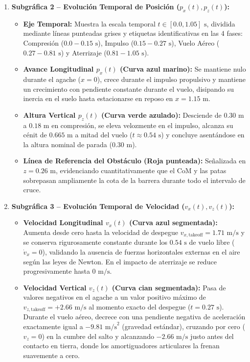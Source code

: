 \documentclass[11pt,a4paper]{article}
\begin{document}
\begin{enumerate}
    \item \textbf{Subgráfica 2 -- Evolución Temporal de Posición ($p_x(t), p_z(t)$):}
    \begin{itemize}
        \item \textbf{Eje Temporal:} Muestra la escala temporal $t \in [0.0, 1.05]\text{ s}$, dividida mediante líneas punteadas grises y etiquetas identificativas en las 4 fases: Compresión ($0.0 - 0.15\text{ s}$), Impulso ($0.15 - 0.27\text{ s}$), Vuelo Aéreo ($0.27 - 0.81\text{ s}$) y Aterrizaje ($0.81 - 1.05\text{ s}$).
        \item \textbf{Avance Longitudinal $p_x(t)$ (Curva azul marino):} Se mantiene nulo durante el agache ($x = 0$), crece durante el impulso propulsivo y mantiene un crecimiento con pendiente constante durante el vuelo, disipando su inercia en el suelo hasta estacionarse en reposo en $x = 1.15\text{ m}$.
        \item \textbf{Altura Vertical $p_z(t)$ (Curva verde azulado):} Desciende de $0.30\text{ m}$ a $0.18\text{ m}$ en compresión, se eleva velozmente en el impulso, alcanza su cénit de $0.665\text{ m}$ a mitad del vuelo ($t \approx 0.54\text{ s}$) y concluye asentándose en la altura nominal de parada ($0.30\text{ m}$).
        \item \textbf{Línea de Referencia del Obstáculo (Roja punteada):} Señalizada en $z = 0.26\text{ m}$, evidenciando cuantitativamente que el CoM y las patas sobrepasan ampliamente la cota de la barrera durante todo el intervalo de cruce.
    \end{itemize}

    \item \textbf{Subgráfica 3 -- Evolución Temporal de Velocidad ($v_x(t), v_z(t)$):}
    \begin{itemize}
        \item \textbf{Velocidad Longitudinal $v_x(t)$ (Curva azul segmentada):} Aumenta desde cero hasta la velocidad de despegue $v_{x,\text{takeoff}} = 1.71\text{ m/s}$ y se conserva rigurosamente constante durante los $0.54\text{ s}$ de vuelo libre ($\dot{v}_x = 0$), validando la ausencia de fuerzas horizontales externas en el aire según las leyes de Newton. En el impacto de aterrizaje se reduce progresivamente hasta $0\text{ m/s}$.
        \item \textbf{Velocidad Vertical $v_z(t)$ (Curva cian segmentada):} Pasa de valores negativos en el agache a un valor positivo máximo de $v_{z,\text{takeoff}} = +2.66\text{ m/s}$ al momento exacto del despegue ($t = 0.27\text{ s}$). Durante el vuelo aéreo, decrece con una pendiente negativa de aceleración exactamente igual a $-9.81\text{ m/s}^2$ (gravedad estándar), cruzando por cero ($v_z = 0$) en la cumbre del salto y alcanzando $-2.66\text{ m/s}$ justo antes del contacto en tierra, donde los amortiguadores articulares la frenan suavemente a cero.
    \end{itemize}
\end{enumerate}
\end{document}
